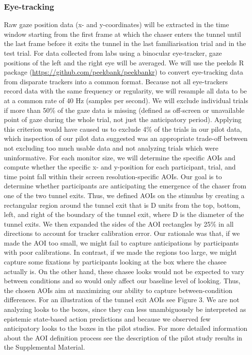 \documentclass[
  man,floatsintext]{apa6}
\begin{document}
\subsubsection{Eye-tracking}\label{eye-tracking}

Raw gaze position data (x- and y-coordinates) will be extracted in the time window starting from the first frame at which the chaser enters the tunnel until the last frame before it exits the tunnel in the last familiarisation trial and in the test trial. For data collected from labs using a binocular eye-tracker, gaze positions of the left and the right eye will be averaged.
We will use the peekds R package (\url{https://github.com/peekbank/peekbankr}) to convert eye-tracking data from disparate trackers into a common format. Because not all eye-trackers record data with the same frequency or regularity, we will resample all data to be at a common rate of 40 Hz (samples per second).
We will exclude individual trials if more than 50\% of the gaze data is missing (defined as off-screen or unavailable point of gaze during the whole trial, not just the anticipatory period). Applying this criterion would have caused us to exclude 4\% of the trials in our pilot data, which inspection of our pilot data suggested was an appropriate trade-off between not excluding too much usable data and not analyzing trials which were uninformative.
For each monitor size, we will determine the specific AOIs and compute whether the specific x- and y-position for each participant, trial, and time point fall within their screen resolution-specific AOIs. Our goal is to determine whether participants are anticipating the emergence of the chaser from one of the two tunnel exits. Thus, we defined AOIs on the stimulus by creating a rectangular region around the tunnel exit that is D units from the top, bottom, left, and right of the boundary of the tunnel exit, where D is the diameter of the tunnel exits. We then expanded the sides of the AOI rectangles by 25\% in all directions to account for tracker calibration error. Our rationale was that, if we made the AOI too small, we might fail to capture anticipations by participants with poor calibrations. In contrast, if we made the regions too large, we might capture some fixations by participants looking at the box where the chasee actually is. On the other hand, these chasee looks would not be expected to vary between conditions and so would only affect our baseline level of looking. Thus, the chosen AOIs aim at maximizing our ability to capture between-condition differences. For an illustration of the tunnel exit AOIs see Figure 3. We are not analyzing looks to the boxes, since they can less unambiguously be interpreted as epistemic state-based action predictions and because we observed few anticipatory looks to the boxes in the pilot studies. For more detailed information about the AOI definition process see the description of the pilot study results in the Supplemental Material.
\end{document}
